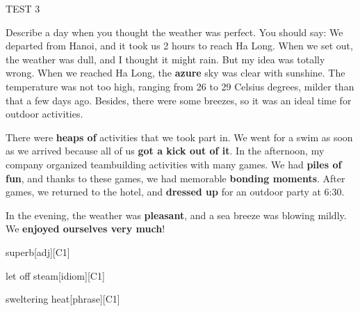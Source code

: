 \begin{glossarymc}[Cambridge 11]
\begin{test}{TEST 3}
\begin{qa}{Describe a day when you thought the weather was perfect. You should say:}
    We departed from Hanoi, and it took us 2 hours to reach Ha Long. When we set out, the weather was dull, and I thought it might rain. But my idea was totally wrong. When we reached Ha Long, the \textbf{azure} sky was clear with sunshine. The temperature was not too high, ranging from 26 to 29 Celsius degrees, milder than that a few days ago. Besides, there were some breezes, so it was an ideal time for outdoor activities.  

    There were \textbf{heaps of} activities that we took part in. We went for a swim as soon as we arrived because all of us \textbf{got a kick out of it}. In the afternoon, my company organized teambuilding activities with many games. We had \textbf{piles of fun}, and thanks to these games, we had memorable \textbf{bonding moments}. After games, we returned to the hotel, and \textbf{dressed up} for an outdoor party at 6:30.  

    In the evening, the weather was \textbf{pleasant}, and a sea breeze was blowing mildly. We \textbf{enjoyed ourselves very much}!
    \end{qa}

        \begin{VocabExplain}[Part 2]
            \begin{ExplainCard}{superb}[adj][C1]
            \end{ExplainCard}

            \begin{ExplainCard}{let off steam}[idiom][C1]
            \end{ExplainCard}

            \begin{ExplainCard}{sweltering heat}[phrase][C1]
            \end{ExplainCard}


\end{VocabExplain}
\end{test}
\end{glossarymc}
